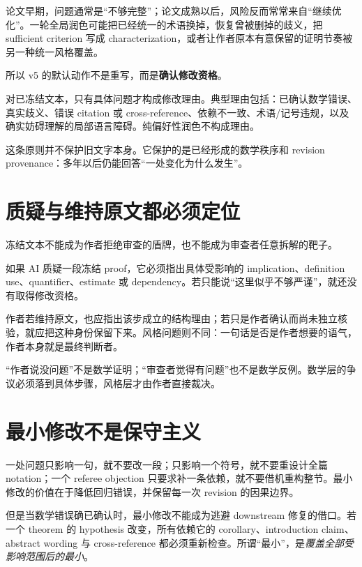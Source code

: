 \documentclass[UTF8,fontset=none,12pt,openany]{ctexbook}
\begin{document}
论文早期，问题通常是“不够完整”；论文成熟以后，风险反而常常来自“继续优化”。一轮全局润色可能把已经统一的术语换掉，恢复曾被删掉的歧义，把 sufficient criterion 写成 characterization，或者让作者原本有意保留的证明节奏被另一种统一风格覆盖。

所以 v5 的默认动作不是重写，而是\textbf{确认修改资格}。

\begin{principle}[修改资格]
对已冻结文本，只有具体问题才构成修改理由。典型理由包括：已确认数学错误、真实歧义、错误 citation 或 cross-reference、依赖不一致、术语/记号违规，以及确实妨碍理解的局部语言障碍。纯偏好性润色不构成理由。
\end{principle}

这条原则并不保护旧文字本身。它保护的是已经形成的数学秩序和 revision provenance：多年以后仍能回答“一处变化为什么发生”。

\section{质疑与维持原文都必须定位}

冻结文本不能成为作者拒绝审查的盾牌，也不能成为审查者任意拆解的靶子。

如果 AI 质疑一段冻结 proof，它必须指出具体受影响的 implication、definition use、quantifier、estimate 或 dependency。若只能说“这里似乎不够严谨”，就还没有取得修改资格。

作者若维持原文，也应指出该步成立的结构理由；若只是作者确认而尚未独立核验，就应把这种身份保留下来。风格问题则不同：一句话是否是作者想要的语气，作者本身就是最终判断者。

\begin{warningbox}[对称性]
“作者说没问题”不是数学证明；“审查者觉得有问题”也不是数学反例。数学层的争议必须落到具体步骤，风格层才由作者直接裁决。
\end{warningbox}

\section{最小修改不是保守主义}

一处问题只影响一句，就不要改一段；只影响一个符号，就不要重设计全篇 notation；一个 referee objection 只要求补一条依赖，就不要借机重构整节。最小修改的价值在于降低回归错误，并保留每一次 revision 的因果边界。

但是当数学错误确已确认时，最小修改不能成为逃避 downstream 修复的借口。若一个 theorem 的 hypothesis 改变，所有依赖它的 corollary、introduction claim、abstract wording 与 cross-reference 都必须重新检查。所谓“最小”，是\emph{覆盖全部受影响范围后的最小}。
\end{document}
